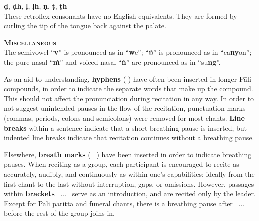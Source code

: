 \begin{justify}
  \textbf{ḍ}, \textbf{ḍh}, \textbf{ḷ}, \textbf{ḷh}, \textbf{ṇ}, \textbf{ṭ}, \textbf{ṭh}\\
  These retroflex consonants have no English equivalents. They are formed by curling the tip of the tongue back against the palate.
\end{justify}

\begin{justify}
  \textbf{\textsc{Miscellaneous}}\\
  The semivowel ``\textbf{v}'' is pronounced as in ``\textbf{w}e''; ``\textbf{ñ}'' is pronounced as in ``ca\textbf{ny}on''; the pure nasal ``\textbf{ṁ}'' and voiced nasal ``\textbf{ṅ}'' are pronounced as in ``su\textbf{ng}''.
\end{justify}

\begin{justify}
  As an aid to understanding, \textbf{hyphens} (-) have often been inserted in longer Pāli compounds, in order to indicate the separate words that make up the compound. This should not affect the pronunciation during recitation in any way. In order to not suggest unintended pauses in the flow of the recitation, punctuation marks (commas, periods, colons and semicolons) were removed for most chants. \textbf{Line breaks} within a sentence indicate that a short breathing pause is inserted, but indented line breaks indicate that recitation continues without a breathing pause.
\end{justify}

\begin{justify}
  Elsewhere, \textbf{breath marks} ( \abbrbreathmark\ ) have been inserted in order to indicate breathing pauses. When reciting as a group, each participant is encouraged to recite as accurately, audibly, and continuously as within one's capabilities; ideally from the first chant to the last without interruption, gaps, or omissions. However, passages within \textbf{brackets} \anglebracketleft\ \hspace{-0.5mm}... \hspace{-0.8mm}\anglebracketright\ serve as an introduction, and are recited only by the leader. Except for Pāli paritta and funeral chants, there is a breathing pause after \anglebracketleft\ \hspace{-0.5mm}... \hspace{-0.8mm}\anglebracketright\, before the rest of the group joins in.
\end{justify}

\clearpage
